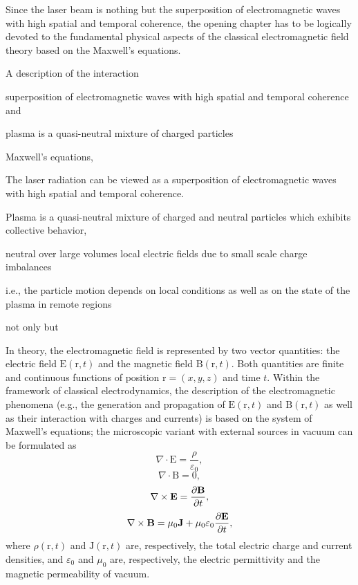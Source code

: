 \documentclass[10pt, a4paper, twoside, openright]{report}
\renewcommand{\vec}[1]{\boldsymbol{\mathrm{#1}}}
\newcommand{\rot}[1]{\nabla \times #1}
\renewcommand{\div}[1]{\nabla \cdot #1}
\begin{document}
Since the laser beam is nothing but the superposition of electromagnetic waves with high
spatial and temporal coherence, the opening chapter has to be logically devoted to the fundamental physical aspects of the classical electromagnetic field theory based on the Maxwell’s
equations.

A description of the interaction 

superposition of electromagnetic waves with high spatial and temporal coherence and 

plasma is a quasi-neutral mixture of charged particles


Maxwell's equations,


The laser radiation can be viewed as a superposition of electromagnetic waves with high spatial and temporal coherence. 

Plasma is a quasi-neutral mixture of charged and neutral particles which exhibits collective behavior,

neutral over large volumes local electric fields due to small scale charge imbalances

 i.e., the particle motion depends on local conditions as well as on the state of the plasma in remote regions

not only  but


In theory, the electromagnetic field is represented by two vector quantities: the electric field $ \vec{E} \left( \vec{r}, t \right) $ and the magnetic field $ \vec{B} \left( \vec{r}, t \right) $. Both quantities are finite and continuous functions of position $ \vec{r} = \left( x, y, z \right) $ and time $ t $. Within the framework of classical electrodynamics, the description of the electromagnetic phenomena (e.g., the generation and propagation of $ \vec{E} \left( \vec{r}, t \right) $ and $ \vec{B} \left( \vec{r}, t \right) $ as well as their interaction with charges and currents) is based on the system of Maxwell's equations; the microscopic variant with external sources in vacuum can be formulated as
\begin{equation}\label{key}
	\div{\vec{E}} = \frac{\rho}{\varepsilon_0},
\end{equation}
\begin{equation}\label{key}
	\div{\vec{B}} = 0,
\end{equation}
\begin{equation}\label{key}
	\rot{\vec{E}} = \diffp{\vec{B}}{t},
\end{equation}
\begin{equation}\label{key}
	\rot{\vec{B}} = \mu_0 \vec{J} + \mu_0 \varepsilon_0 \diffp{\vec{E}}{t},
\end{equation}
where $ \rho \left( \vec{r}, t \right) $ and $ \vec{J} \left( \vec{r}, t \right) $ are, respectively, the total electric charge and current densities, and $ \varepsilon_0 $ and $ \mu_0 $ are, respectively, the electric permittivity and the magnetic permeability of vacuum.
\end{document}
